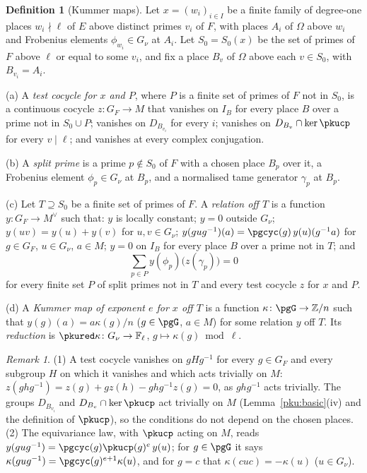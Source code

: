 \documentclass[10pt]{amsart}
\theoremstyle{definition}
\newtheorem{definition}[theorem]{Definition}
\theoremstyle{remark}
\newtheorem{remark}[theorem]{Remark}
\newcommand{\Z}{\mathbb Z}
\begin{document}
\begin{definition}[Kummer maps]\label{pku:def-kummer}
Let $x=(w_i)_{i\in I}$ be a finite family of degree-one places $w_i\nmid\ell$ of $E$ above distinct
primes $v_i$ of $F$, with places $A_i$ of $\Omega$ above $w_i$ and Frobenius elements $\phi_{w_i}
\in G_\nu$ at $A_i$. Let $S_0=S_0(x)$ be the set of primes of $F$ above $\ell$ or equal to some
$v_i$, and fix a place $B_v$ of $\Omega$ above each $v\in S_0$, with $B_{v_i}=A_i$.

(a) A \emph{test cocycle for $x$ and $P$}, where $P$ is a finite set of primes of $F$ not in
$S_0$, is a continuous cocycle $z\colon G_F\to M$ that vanishes on $I_B$ for every place $B$ over a
prime not in $S_0\cup P$; vanishes on $D_{B_{v_i}}$ for every $i$; vanishes on $D_{B_v}\cap\ker
\pkucp$ for every $v\mid\ell$; and vanishes at every complex conjugation.

(b) A \emph{split prime} is a prime $p\notin S_0$ of $F$ with a chosen place $B_p$ over it, a
Frobenius element $\phi_p\in G_\nu$ at $B_p$, and a normalised tame generator $\gamma_p$ at $B_p$.

(c) Let $T\supseteq S_0$ be a finite set of primes of $F$. A \emph{relation off $T$} is a function
$y\colon G_F\to M^\vee$ such that: $y$ is locally constant; $y=0$ outside $G_\nu$; $y(uv)=y(u)+y(v)$
for $u,v\in G_\nu$; $y(gug^{-1})(a)=\pgcyc(g)\,y(u)(g^{-1}a)$ for $g\in G_F$, $u\in G_\nu$, $a\in
M$; $y=0$ on $I_B$ for every place $B$ over a prime not in $T$; and
\begin{equation}\label{pku:eq-recip}
\sum_{p\in P}y(\phi_p)\bigl(z(\gamma_p)\bigr)=0
\end{equation}
for every finite set $P$ of split primes not in $T$ and every test cocycle $z$ for $x$ and $P$.

(d) A \emph{Kummer map of exponent $e$ for $x$ off $T$} is a function $\kappa\colon\pgG\to\Z/n$
such that $y(g)(a)=a\kappa(g)/n$ ($g\in\pgG$, $a\in M$) for some relation $y$ off $T$. Its
\emph{reduction} is $\pkured\kappa\colon G_\nu\to\mathbb F_\ell$, $g\mapsto\kappa(g)\bmod\ell$.
\end{definition}

\begin{remark}\label{pku:rem-def}
(1) A test cocycle vanishes on $gHg^{-1}$ for every $g\in G_F$ and every subgroup $H$ on which it
vanishes and which acts trivially on $M$: $z(ghg^{-1})=z(g)+gz(h)-ghg^{-1}z(g)=0$, as $ghg^{-1}$
acts trivially. The groups $D_{B_{v_i}}$ and $D_{B_v}\cap\ker\pkucp$ act trivially on $M$
(Lemma~\ref{pku:basic}(iv) and the definition of $\pkucp$), so the conditions do not depend on the
chosen places. (2) The equivariance law, with $\pkucp$ acting on $M$, reads
$y(gug^{-1})=\pgcyc(g)\pkucp(g)^{e}\,y(u)$; for $g\in\pgG$ it says $\kappa(gug^{-1})=
\pgcyc(g)^{e+1}\kappa(u)$, and for $g=c$ that $\kappa(cuc)=-\kappa(u)$ ($u\in G_\nu$).
\end{remark}
\end{document}
